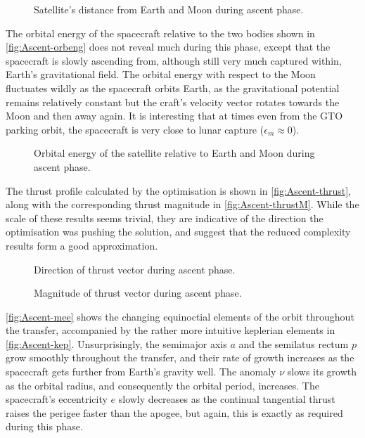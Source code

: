 \begin{figure}
\centering
\def\svgwidth{\figurewidth}

\caption{Satellite's distance from Earth and Moon during ascent phase.}
\label{fig:Ascent-dist}
\end{figure}

The orbital energy of the spacecraft relative to the two bodies shown in \autoref{fig:Ascent-orbeng} does not reveal much during this phase, except that the spacecraft is slowly ascending from, although still very much captured within, Earth's gravitational field. The orbital energy with respect to the Moon fluctuates wildly as the spacecraft orbits Earth, as the gravitational potential remains relatively constant but the craft's velocity vector rotates towards the Moon and then away again. It is interesting that at times even from the GTO parking orbit, the spacecraft is very close to lunar capture ($\epsilon_m\approx0$).

\begin{figure}
\centering
\def\svgwidth{\figurewidth}

\caption{Orbital energy of the satellite relative to Earth and Moon during ascent phase.}
\label{fig:Ascent-orbeng}
\end{figure}

The thrust profile calculated by the optimisation is shown in \autoref{fig:Ascent-thrust}, along with the corresponding thrust magnitude in \autoref{fig:Ascent-thrustM}. While the scale of these results seems trivial, they are indicative of the direction the optimisation was pushing the solution, and suggest that the reduced complexity results form a good approximation. 

\begin{figure}
\centering
\def\svgwidth{\figurewidth}

\caption{Direction of thrust vector during ascent phase.}
\label{fig:Ascent-thrust}
\end{figure}

\begin{figure}
\centering
\def\svgwidth{\figurewidth}

\caption{Magnitude of thrust vector during ascent phase.}
\label{fig:Ascent-thrustM}
\end{figure}

\autoref{fig:Ascent-mee} shows the changing equinoctial elements of the orbit throughout the transfer, accompanied by the rather more intuitive keplerian elements in \autoref{fig:Ascent-kep}. Unsurprisingly, the semimajor axis $a$ and the semilatus rectum $p$ grow smoothly throughout the transfer, and their rate of growth increases as the spacecraft gets further from Earth's gravity well. The anomaly $\nu$ slows its growth as the orbital radius, and consequently the orbital period, increases. The spacecraft's eccentricity $e$ slowly decreases as the continual tangential thrust raises the perigee faster than the apogee, but again, this is exactly as required during this phase.

